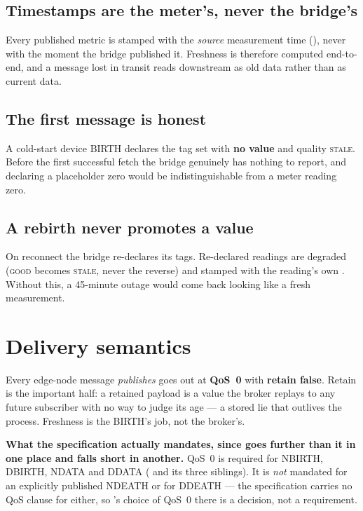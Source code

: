 \subsection{Timestamps are the meter's, never the bridge's}

Every published metric is stamped with the \emph{source} measurement time
(), never with the moment the bridge published it. Freshness is therefore
computed end-to-end, and a message lost in transit reads downstream as old data rather
than as current data.

\subsection{The first message is honest}

A cold-start device BIRTH declares the tag set with \textbf{no value} and quality
\textsc{stale}. Before the first successful fetch the bridge genuinely has nothing to
report, and declaring a placeholder zero would be indistinguishable from a meter reading
zero.

\subsection{A rebirth never promotes a value}

On reconnect the bridge re-declares its tags. Re-declared readings are degraded
(\textsc{good} becomes \textsc{stale}, never the reverse) and stamped with the reading's
own . Without this, a 45-minute outage would come back looking like a
fresh measurement.

\section{Delivery semantics}

Every edge-node message \prog \emph{publishes} goes out at \textbf{QoS~0} with
\textbf{retain false}. Retain is the important half: a retained payload is a value the
broker replays to any future subscriber with no way to judge its age --- a stored lie that
outlives the process. Freshness is the BIRTH's job, not the broker's.

\begin{note}
\textbf{What the specification actually mandates, since \prog goes further than it in one
place and falls short in another.} QoS~0 is required for NBIRTH, DBIRTH, NDATA and DDATA
( and its three siblings). It is \emph{not} mandated for
an explicitly published NDEATH or for DDEATH --- the specification carries no QoS clause
for either, so \prog's choice of QoS~0 there is a decision, not a requirement.
\end{note}

